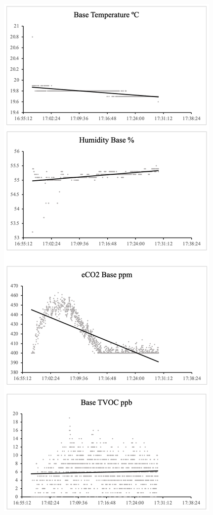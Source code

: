 \documentclass{ueacmpstyle}
\begin{document}
            \includegraphics[scale=0.3]{Images/base.png}
\end{document}
